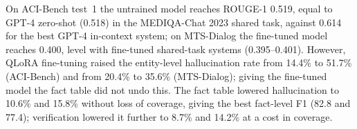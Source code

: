 On ACI-Bench test~1 the untrained model reaches ROUGE-1 0.519, equal to GPT-4 zero-shot (0.518) in the
MEDIQA-Chat 2023 shared task, against 0.614 for the best GPT-4 in-context system; on MTS-Dialog the
fine-tuned model reaches 0.400, level with fine-tuned shared-task systems (0.395--0.401). However, QLoRA
fine-tuning raised the entity-level hallucination rate from 14.4\% to 51.7\% (ACI-Bench) and from 20.4\% to
35.6\% (MTS-Dialog); giving the fine-tuned model the fact table did not undo this. The fact table lowered hallucination to 10.6\% and 15.8\% without loss of coverage, giving
the best fact-level F1 (82.8 and 77.4); verification lowered it further to 8.7\% and 14.2\% at a cost in
coverage.
